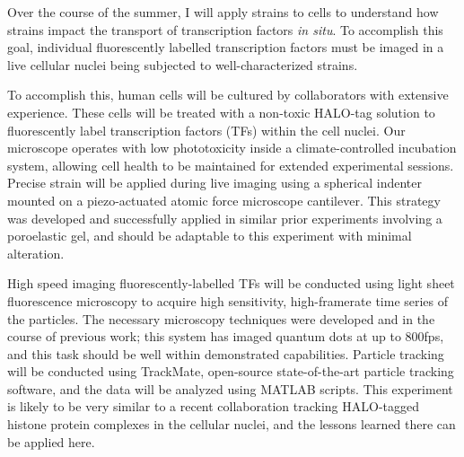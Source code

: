 

Over the course of the summer, I will apply strains to cells to understand how strains impact the transport of transcription factors \textit{in situ}. To accomplish this goal, individual fluorescently labelled transcription factors must be imaged in a live cellular nuclei being subjected to well-characterized strains. 

To accomplish this, human cells will be cultured by collaborators with extensive experience. These cells will be treated with a non-toxic HALO-tag solution to fluorescently label transcription factors (TFs) within the cell nuclei. Our microscope operates with low phototoxicity inside a climate-controlled incubation system, allowing cell health to be maintained for extended experimental sessions. Precise strain will be applied during live imaging using a spherical indenter mounted on a piezo-actuated atomic force microscope cantilever. This strategy was developed and successfully applied in similar prior experiments involving a poroelastic gel, and should be adaptable to this experiment with minimal alteration.

High speed imaging fluorescently-labelled TFs will be conducted using light sheet fluorescence microscopy to acquire high sensitivity, high-framerate time series of the particles. The necessary microscopy techniques were developed and in the course of previous work; this system has imaged quantum dots at up to 800fps, and this task should be well within demonstrated capabilities. Particle tracking will be conducted using TrackMate, open-source state-of-the-art particle tracking software, and the data will be analyzed using MATLAB scripts. This experiment is likely to be very similar to a recent collaboration tracking HALO-tagged histone protein complexes in the cellular nuclei, and the lessons learned there can be applied here.\par

